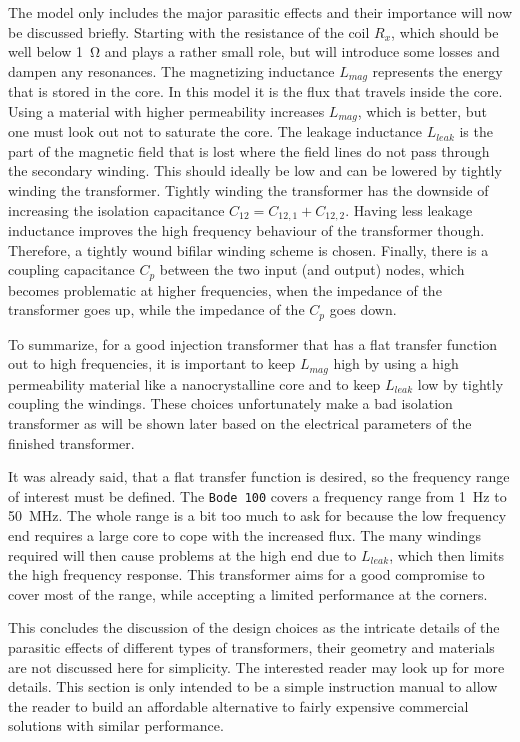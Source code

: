 \documentclass[12pt]{book}
\providecommand{\device}[1]{\texttt{\small #1}}
\begin{document}
The model only includes the major parasitic effects and their importance will now be discussed briefly. Starting with the resistance of the coil $R_x$, which should be well below \qty{1}{\ohm} and plays a rather small role, but will introduce some losses and dampen any resonances. The magnetizing inductance $L_{mag}$ represents the energy that is stored in the core. In this model it is the flux that travels inside the core. Using a material with higher permeability increases $L_{mag}$, which is better, but one must look out not to saturate the core. The leakage inductance $L_{leak}$ is the part of the magnetic field that is lost where the field lines do not pass through the secondary winding. This should ideally be low and can be lowered by tightly winding the transformer. Tightly winding the transformer has the downside of increasing the isolation capacitance $C_{12} = C_{12,1} + C_{12,2}$. Having less leakage inductance improves the high frequency behaviour of the transformer though. Therefore, a tightly wound bifilar winding scheme is chosen. Finally, there is a coupling capacitance $C_p$ between the two input (and output) nodes, which becomes problematic at higher frequencies, when the impedance of the transformer goes up, while the impedance of the $C_p$ goes down.

To summarize, for a good injection transformer that has a flat transfer function out to high frequencies, it is important to keep $L_{mag}$ high by using a high permeability material like a nanocrystalline core and to keep $L_{leak}$ low by tightly coupling the windings. These choices unfortunately make a bad isolation transformer as will be shown later based on the electrical parameters of the finished transformer.

It was already said, that a flat transfer function is desired, so the frequency range of interest must be defined. The \device{Bode 100} covers a frequency range from \qty{1}{\Hz} to \qty{50}{\MHz}. The whole range is a bit too much to ask for because the low frequency end requires a large core to cope with the increased flux. The many windings required will then cause problems at the high end due to $L_{leak}$, which then limits the high frequency response. This transformer aims for a good compromise to cover most of the range, while accepting a limited performance at the corners.

This concludes the discussion of the design choices as the intricate details of the parasitic effects of different types of transformers, their geometry and materials are not discussed here for simplicity. The interested reader may look up \cite{transformer_windings} for more details. This section is only intended to be a simple instruction manual to allow the reader to build an affordable alternative to fairly expensive commercial solutions with similar performance.
\end{document}
